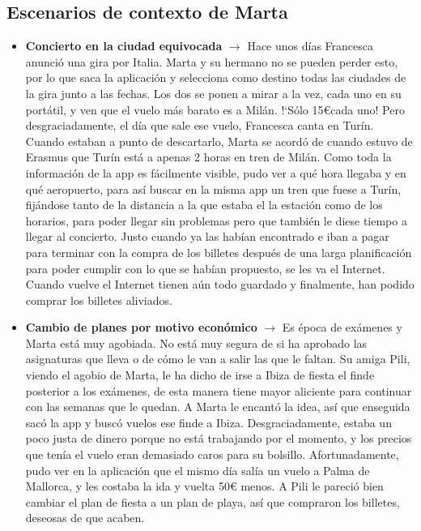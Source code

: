 \subsection{Escenarios de contexto de Marta}
\begin{itemize}
    \item \textbf{Concierto en la ciudad equivocada} $\rightarrow$ Hace unos días Francesca anunció una gira por Italia. Marta y su
    hermano no se pueden perder esto, por lo que saca la aplicación y selecciona como destino todas las ciudades de
    la gira junto a las fechas. Los dos se ponen a mirar a la vez, cada uno en su portátil, y ven que el vuelo más
    barato es a Milán. !`Sólo 15\euro\space cada uno! Pero desgraciadamente, el día que sale ese vuelo, Francesca canta en Turín.
    Cuando estaban a punto de descartarlo, Marta se acordó de cuando estuvo de Erasmus que Turín está a apenas 2 horas
    en tren de Milán. Como toda la información de la app es fácilmente visible, pudo ver a qué hora llegaba y en qué
    aeropuerto, para así buscar en la misma app un tren que fuese a Turín, fijándose tanto de la distancia a la que estaba el la estación como de los horarios, para poder llegar sin problemas pero que también le diese tiempo a llegar al concierto. Justo cuando ya las habían encontrado e iban a pagar para terminar con la compra de los billetes después de una larga planificación para poder cumplir con lo que se habían propuesto, se les va el Internet. Cuando vuelve el Internet tienen aún todo guardado y finalmente, han podido comprar los billetes aliviados.
    
    \item \textbf{Cambio de planes por motivo económico} $\rightarrow$ Es época de exámenes y Marta está muy agobiada.
    No está muy segura de si ha aprobado las asignaturas que lleva o de cómo le van a salir las que le faltan. Su amiga
    Pili, viendo el agobio de Marta, le ha dicho de irse a Ibiza de fiesta el finde posterior a los exámenes, de esta
    manera tiene mayor aliciente para continuar con las semanas que le quedan. A Marta le encantó la idea, así que
    enseguida sacó la app y buscó vuelos ese finde a Ibiza. Desgraciadamente, estaba un poco justa de dinero porque no
    está trabajando por el momento, y los precios que tenía el vuelo eran demasiado caros para su bolsillo. Afortunadamente,
    pudo ver en la aplicación que el mismo día salía un vuelo a Palma de Mallorca, y les costaba la ida y vuelta 50€
    menos. A Pili le pareció bien cambiar el plan de fiesta a un plan de playa, así que compraron los billetes, deseosas
    de que acaben.
\end{itemize}
